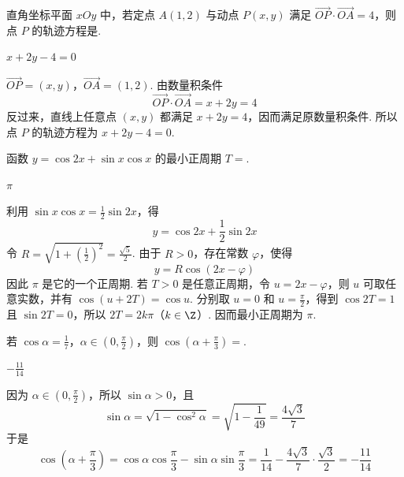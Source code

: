 \begin{problem}
直角坐标平面 \(xOy\) 中，若定点 \(A(1,2)\) 与动点 \(P(x,y)\) 满足 \(\overrightarrow{OP} \cdot \overrightarrow{OA} = 4\)，则点 \(P\) 的轨迹方程是\fillinblank{}.
\end{problem}

\begin{answer}
\(x+2y-4=0\)
\end{answer}

\begin{solution}
\(\overrightarrow{OP}=(x,y)\)，\(\overrightarrow{OA}=(1,2)\). 由数量积条件
\[
\overrightarrow{OP}\cdot\overrightarrow{OA}=x+2y=4
\]
反过来，直线上任意点 \((x,y)\) 都满足 \(x+2y=4\)，因而满足原数量积条件. 所以点 \(P\) 的轨迹方程为 \(x+2y-4=0\).
\end{solution}

\begin{problem}
函数 \( y = \cos 2x + \sin x \cos x \) 的最小正周期 \( T = \)\fillinblank{}.
\end{problem}

\begin{answer}
\(\pi\)
\end{answer}

\begin{solution}
利用 \(\sin x\cos x=\frac12\sin2x\)，得
\[
y=\cos2x+\frac12\sin2x
\]
令 \(R=\sqrt{1+\left(\frac12\right)^2}=\frac{\sqrt5}{2}\). 由于 \(R>0\)，存在常数 \(\varphi\)，使得
\[
y=R\cos(2x-\varphi)
\]
因此 \(\pi\) 是它的一个正周期. 若 \(T>0\) 是任意正周期，令 \(u=2x-\varphi\)，则 \(u\) 可取任意实数，并有 \(\cos(u+2T)=\cos u\). 分别取 \(u=0\) 和 \(u=\frac\pi2\)，得到 \(\cos2T=1\) 且 \(\sin2T=0\)，所以 \(2T=2k\pi\)（\(k\in\Z\)）. 因而最小正周期为 \(\pi\).
\end{solution}

\begin{problem}
若 \( \cos\alpha=\frac{1}{7} \)，\(\alpha\in\left(0,\frac{\pi}{2}\right)\)，则 \( \cos\left(\alpha+\frac{\pi}{3}\right)= \)\fillinblank{}.
\end{problem}

\begin{answer}
\(-\frac{11}{14}\)
\end{answer}

\begin{solution}
因为 \(\alpha\in(0,\frac\pi2)\)，所以 \(\sin\alpha>0\)，且
\[
\sin\alpha=\sqrt{1-\cos^2\alpha}=\sqrt{1-\frac1{49}}=\frac{4\sqrt3}{7}
\]
于是
\[
\cos\left(\alpha+\frac\pi3\right)=\cos\alpha\cos\frac\pi3-\sin\alpha\sin\frac\pi3=\frac1{14}-\frac{4\sqrt3}{7}\cdot\frac{\sqrt3}{2}=-\frac{11}{14}
\]
\end{solution}


